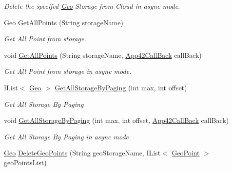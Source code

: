 \begin{DoxyCompactItemize}
\begin{DoxyCompactList}\small\item\em Delete the specifed \hyperlink{classcom_1_1shephertz_1_1app42_1_1paas_1_1sdk_1_1csharp_1_1geo_1_1_geo}{Geo} Storage from Cloud in async mode. \end{DoxyCompactList}\item 
\hyperlink{classcom_1_1shephertz_1_1app42_1_1paas_1_1sdk_1_1csharp_1_1geo_1_1_geo}{Geo} \hyperlink{classcom_1_1shephertz_1_1app42_1_1paas_1_1sdk_1_1csharp_1_1geo_1_1_geo_service_adce848a6043c48d3cbcee19d918db9d9}{Get\+All\+Points} (String storage\+Name)
\begin{DoxyCompactList}\small\item\em Get All Point from storage. \end{DoxyCompactList}\item 
void \hyperlink{classcom_1_1shephertz_1_1app42_1_1paas_1_1sdk_1_1csharp_1_1geo_1_1_geo_service_a8e0896b51a7d76036c70bae9dea4209f}{Get\+All\+Points} (String storage\+Name, \hyperlink{interfacecom_1_1shephertz_1_1app42_1_1paas_1_1sdk_1_1csharp_1_1_app42_call_back}{App42\+Call\+Back} call\+Back)
\begin{DoxyCompactList}\small\item\em Get All Point from storage in async mode. \end{DoxyCompactList}\item 
I\+List$<$ \hyperlink{classcom_1_1shephertz_1_1app42_1_1paas_1_1sdk_1_1csharp_1_1geo_1_1_geo}{Geo} $>$ \hyperlink{classcom_1_1shephertz_1_1app42_1_1paas_1_1sdk_1_1csharp_1_1geo_1_1_geo_service_a44ae6ffe3aded31a56a5cebe4262dd64}{Get\+All\+Storage\+By\+Paging} (int max, int offset)
\begin{DoxyCompactList}\small\item\em Get All Storage By Paging \end{DoxyCompactList}\item 
void \hyperlink{classcom_1_1shephertz_1_1app42_1_1paas_1_1sdk_1_1csharp_1_1geo_1_1_geo_service_a844c848f50614cb22cf922d15c9e2717}{Get\+All\+Storage\+By\+Paging} (int max, int offset, \hyperlink{interfacecom_1_1shephertz_1_1app42_1_1paas_1_1sdk_1_1csharp_1_1_app42_call_back}{App42\+Call\+Back} call\+Back)
\begin{DoxyCompactList}\small\item\em Get All Storage By Paging in async mode \end{DoxyCompactList}\item 
\hyperlink{classcom_1_1shephertz_1_1app42_1_1paas_1_1sdk_1_1csharp_1_1geo_1_1_geo}{Geo} \hyperlink{classcom_1_1shephertz_1_1app42_1_1paas_1_1sdk_1_1csharp_1_1geo_1_1_geo_service_a9ce835c9ee0e861c305de603aea7f6af}{Delete\+Geo\+Points} (String geo\+Storage\+Name, I\+List$<$ \hyperlink{classcom_1_1shephertz_1_1app42_1_1paas_1_1sdk_1_1csharp_1_1geo_1_1_geo_point}{Geo\+Point} $>$ geo\+Points\+List)

\end{DoxyCompactItemize}
